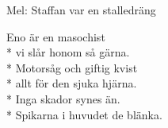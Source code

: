 \begin{SongText}[ENO]
    \begin{SongInfo}
        Mel: Staffan var en stalledräng
    \end{SongInfo}
    \begin{SongVerse}
        Eno är en masochist\\*%
        vi slår honom så gärna.\\*%
        Motorsåg och giftig kvist\\*%
        allt för den sjuka hjärna.\\*%
        Inga skador synes än.\\*%
        Spikarna i huvudet de blänka.
    \end{SongVerse}
\end{SongText}
